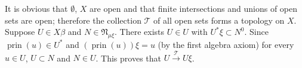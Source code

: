 It is obvious that $\emptyset$, $X$ are open and that finite intersections and unions of open sets are open; therefore the collection $\mathcal{T}$ of all open sets forms a topology on $X$. Suppose $U \in X\beta$ and $N \in \mathfrak{N}_{\mu\xi}$. There exists $U \in U$ with $U^*\xi \subset N^0$. Since $\operatorname{prin}(u) \in U^*$ and $(\operatorname{prin}(u))\xi = u$ (by the first algebra axiom) for every $u \in U$, $U \subset N$ and $N \in U$. This proves that $U \xrightarrow{\mathcal{T}} U\xi$.